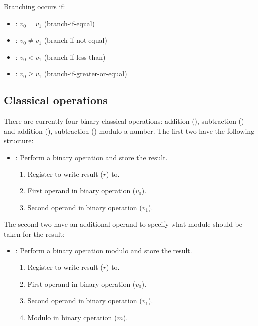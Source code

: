 Branching occurs if:
\begin{itemize}
  \item {}: $v_0 = v_1$ (branch-if-equal)
  \item {}: $v_0 \neq v_1$ (branch-if-not-equal)
  \item {}: $v_0 < v_1$ (branch-if-less-than)
  \item {}: $v_0 \geq v_1$ (branch-if-greater-or-equal)
\end{itemize}


\subsection{Classical operations}
There are currently four binary classical operations: addition (), subtraction () and addition (), subtraction () modulo a number.
The first two have the following structure:
\begin{itemize}
  \item {}: Perform a binary operation and store the result.
        \begin{enumerate}
          \item \REGISTER Register to write result ($r$) to.
          \item \REGISTER First operand in binary operation ($v_0$).
          \item \REGISTER Second operand in binary operation ($v_1$).
        \end{enumerate}
\end{itemize}

The second two have an additional operand to specify what module should be taken for the result:
\begin{itemize}
  \item {}: Perform a binary operation modulo  and store the result.
        \begin{enumerate}
          \item \REGISTER Register to write result ($r$) to.
          \item \REGISTER First operand in binary operation ($v_0$).
          \item \REGISTER Second operand in binary operation ($v_1$).
          \item \REGISTER Modulo in binary operation ($m$).
        \end{enumerate}
\end{itemize}

